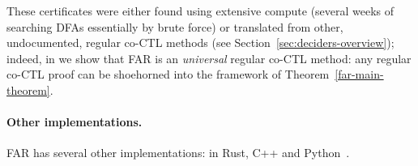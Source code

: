 These certificates were either found using extensive compute (\eg several weeks of searching DFAs essentially by brute force) or translated from other, undocumented, regular co-CTL methods (see Section~\ref{sec:deciders-overview}); indeed, in \cite{bbchallenge_part1} we show that FAR is an \textit{universal} regular co-CTL method: any regular co-CTL proof can be shoehorned into the framework of Theorem~\ref{far-main-theorem}.

\paragraph{Other implementations.} FAR has several other implementations: in Rust, C++ and Python~\cite{FAR,FAR_Tony,FAR_cosmo}.





